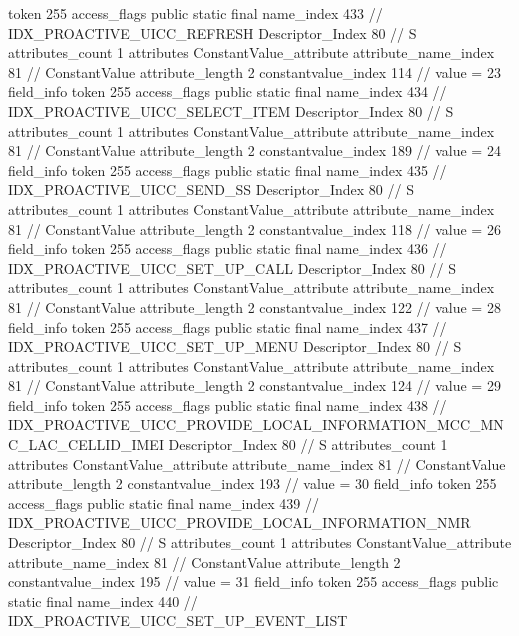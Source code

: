 {{{{{				token	255
				access_flags	public static final
				name_index	433		// IDX_PROACTIVE_UICC_REFRESH
				Descriptor_Index	80		// S
				attributes_count	1
				attributes {
				ConstantValue_attribute {
					attribute_name_index	81		// ConstantValue
					attribute_length	2
					constantvalue_index	114		// value = 23
				}
				}
			}
			field_info {
				token	255
				access_flags	public static final
				name_index	434		// IDX_PROACTIVE_UICC_SELECT_ITEM
				Descriptor_Index	80		// S
				attributes_count	1
				attributes {
				ConstantValue_attribute {
					attribute_name_index	81		// ConstantValue
					attribute_length	2
					constantvalue_index	189		// value = 24
				}
				}
			}
			field_info {
				token	255
				access_flags	public static final
				name_index	435		// IDX_PROACTIVE_UICC_SEND_SS
				Descriptor_Index	80		// S
				attributes_count	1
				attributes {
				ConstantValue_attribute {
					attribute_name_index	81		// ConstantValue
					attribute_length	2
					constantvalue_index	118		// value = 26
				}
				}
			}
			field_info {
				token	255
				access_flags	public static final
				name_index	436		// IDX_PROACTIVE_UICC_SET_UP_CALL
				Descriptor_Index	80		// S
				attributes_count	1
				attributes {
				ConstantValue_attribute {
					attribute_name_index	81		// ConstantValue
					attribute_length	2
					constantvalue_index	122		// value = 28
				}
				}
			}
			field_info {
				token	255
				access_flags	public static final
				name_index	437		// IDX_PROACTIVE_UICC_SET_UP_MENU
				Descriptor_Index	80		// S
				attributes_count	1
				attributes {
				ConstantValue_attribute {
					attribute_name_index	81		// ConstantValue
					attribute_length	2
					constantvalue_index	124		// value = 29
				}
				}
			}
			field_info {
				token	255
				access_flags	public static final
				name_index	438		// IDX_PROACTIVE_UICC_PROVIDE_LOCAL_INFORMATION_MCC_MNC_LAC_CELLID_IMEI
				Descriptor_Index	80		// S
				attributes_count	1
				attributes {
				ConstantValue_attribute {
					attribute_name_index	81		// ConstantValue
					attribute_length	2
					constantvalue_index	193		// value = 30
				}
				}
			}
			field_info {
				token	255
				access_flags	public static final
				name_index	439		// IDX_PROACTIVE_UICC_PROVIDE_LOCAL_INFORMATION_NMR
				Descriptor_Index	80		// S
				attributes_count	1
				attributes {
				ConstantValue_attribute {
					attribute_name_index	81		// ConstantValue
					attribute_length	2
					constantvalue_index	195		// value = 31
				}
				}
			}
			field_info {
				token	255
				access_flags	public static final
				name_index	440		// IDX_PROACTIVE_UICC_SET_UP_EVENT_LIST
}}}}}
